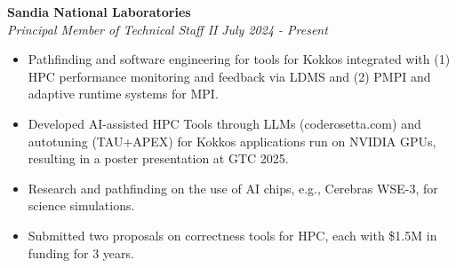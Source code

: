 



\newcommand{\myExpOne}{
\item Pathfinding and software engineering for tools for Kokkos integrated with (1) HPC performance monitoring and feedback via LDMS and (2) PMPI and adaptive runtime systems for MPI.
\item Developed AI-assisted HPC Tools through LLMs (coderosetta.com) and autotuning (TAU+APEX) for Kokkos applications run on NVIDIA GPUs, resulting in a poster presentation at GTC 2025. 
\item Research and pathfinding on the use of AI chips, e.g., Cerebras WSE-3, for science simulations. 
\item Submitted two proposals on correctness tools for HPC, each with \$1.5M in funding for 3 years. 
}
\textbf{Sandia National Laboratories}\\
\textit{Principal Member of Technical Staff II} \hfill \textit{July 2024 - Present}
\noindent
\begin{itemize}[itemsep=-0.1em]\onlyitems[include={1,2}]
\myExpOne
\end{itemize}


\newcommand{\myExpTwo}{
	\item Developed and maintained Kokkos Tools for the CMake and Spack build system, tooling overheads, CI/CD, auto-tuning, and nvtx/roctx/vtune integration, leading to 15 merged github PRs.
   \item Developed a debugging tool that detected 7 common Kokkos user bugs by analyzing LLVM IR of Kokkos programs via symbolic execution, leading to a paper at SC24's Correctness workshop. 
    \item Implemented prototype LLVM OpenMP feature for index set splitting of an OpenMP loop, leading to a 1.2x speedup for an OpenMP + CUDA benchmark and to OpenMP 6.0's new split directive. 
    \item Drafted standards for OpenMP multi-GPU features for NVIDIA DGX, and for GPUs  for AWS, Google Cloud, and OCI, leading to 19 proposed features for OpenMP versions 6.1 and 7.0.

}

